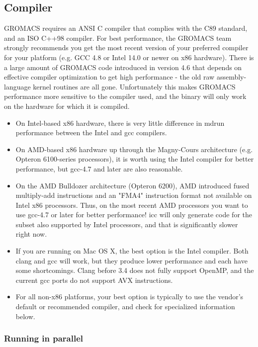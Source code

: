 \documentclass{article}[12pt,a4paper,twoside]
\newcommand{\gromacs}{GROMACS}
\newcommand{\avx}{AVX}
\begin{document}
\subsection{Compiler}

\gromacs{} requires an ANSI C compiler that complies with the C89
standard, and an ISO C++98 compiler. For best performance, the
\gromacs{} team strongly recommends you get the most recent version of
your preferred compiler for your platform (e.g. GCC 4.8 or Intel 14.0
or newer on x86 hardware). There is a large amount of \gromacs{} code
introduced in version 4.6 that depends on effective compiler
optimization to get high performance - the old raw assembly-language
kernel routines are all gone.  Unfortunately this makes \gromacs{} performance
more sensitive to the compiler used, and the binary will only work on
the hardware for which it is compiled.

\begin{itemize}
\item On Intel-based x86 hardware, there is very little difference in
  mdrun performance between the Intel and gcc compilers.
\item On AMD-based x86 hardware up through the Magny-Cours architecture
(e.g. Opteron 6100-series processors), it is worth using the Intel compiler for
better performance, but gcc-4.7 and later are also reasonable.
\item On the AMD Bulldozer architecture (Opteron 6200), AMD introduced fused multiply-add
instructions and an "FMA4" instruction format not available on Intel x86 processors. Thus,
on the most recent AMD processors you want to use gcc-4.7 or later for better performance!
icc will only generate code for the subset also supported by Intel processors, and that
is significantly slower right now.
\item If you are running on Mac OS X, the best option is the Intel compiler.
Both clang and gcc will work, but they produce lower performance and each have some
shortcomings. Clang before 3.4 does not fully support OpenMP, and the current gcc ports do not
support \avx{} instructions.
\item For all non-x86 platforms, your best option is typically to use the vendor's 
default or recommended compiler, and check for specialized information below.
\end{itemize}

\subsubsection{Running in parallel}
\end{document}
